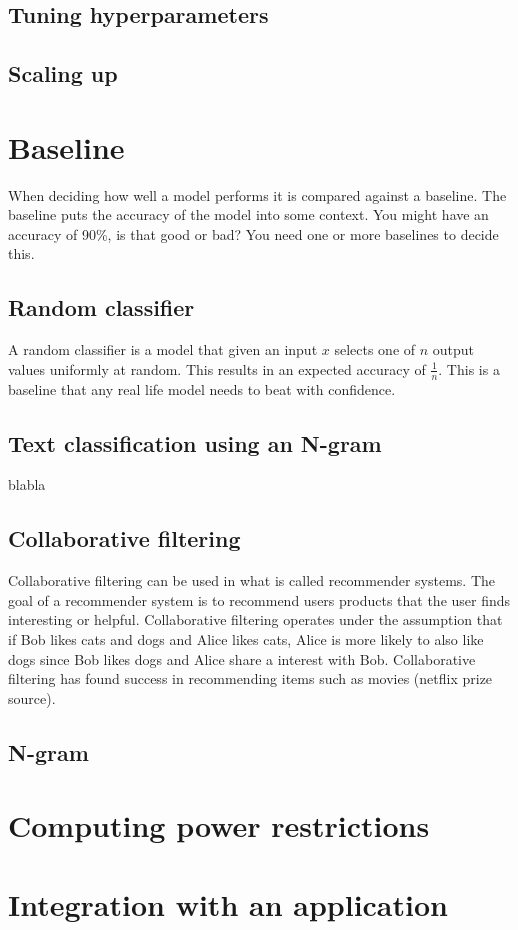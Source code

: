\subsection{Tuning hyperparameters}
\subsection{Scaling up}
\section{Baseline}
When deciding how well a model performs it is compared against a baseline. The baseline puts the accuracy of the model into some context. You might have an accuracy of 90\%, is that good or bad? You need one or more baselines to decide this. 
\subsection{Random classifier}
A random classifier is a model that given an input $x$ selects one of $n$ output values uniformly at random. This results in an expected accuracy of $\frac{1}{n}$. This is a baseline that any real life model needs to beat with confidence.
\subsection{Text classification using an N-gram}
blabla

\subsection{Collaborative filtering}
Collaborative filtering can be used in what is called recommender systems. The goal of a recommender system is to recommend users products that the user finds interesting or helpful. Collaborative filtering operates under the assumption that if Bob likes cats and dogs and Alice likes cats, Alice is more likely to also like dogs since Bob likes dogs and Alice share a interest with Bob. Collaborative filtering has found success in recommending items such as movies (netflix prize source). %

\subsection{N-gram}
\section{Computing power restrictions} %
\section{Integration with an application}


